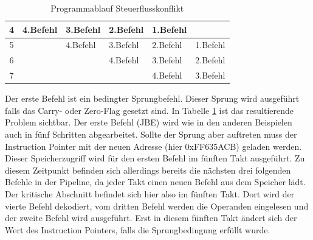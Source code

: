 \documentclass[12pt]{article}
\begin{document}
\begin{table}[]
\begin{tabular}{|c|l|l|l|l|l|}
4             & \cellcolor[HTML]{FFFE65}4.Befehl                                                        & \cellcolor[HTML]{67FD9A}3.Befehl                                                           & \cellcolor[HTML]{38FFF8}2.Befehl                                                            & \cellcolor[HTML]{9698ED}1.Befehl        &                                                                                               \\ \hline
5             & \cellcolor[HTML]{FFFFFF}                                                                & \cellcolor[HTML]{FFFE65}4.Befehl                                                           & \cellcolor[HTML]{67FD9A}3.Befehl                                                            & \cellcolor[HTML]{38FFF8}2.Befehl        & \cellcolor[HTML]{9698ED}1.Befehl                                                              \\ \hline
6             &                                                                                         & \cellcolor[HTML]{FFFFFF}                                                                   & \cellcolor[HTML]{FFFE65}4.Befehl                                                            & \cellcolor[HTML]{67FD9A}3.Befehl        & \cellcolor[HTML]{38FFF8}2.Befehl                                                              \\ \hline
7             &                                                                                         &                                                                                            & \cellcolor[HTML]{FFFFFF}                                                                    & \cellcolor[HTML]{FFFE65}4.Befehl        & \cellcolor[HTML]{67FD9A}3.Befehl                                                              \\ \hline
\end{tabular}
\caption{Programmablauf Steuerflusskonflikt}
\label{tab:Steuerflusskonflikt}

\end{table}

\noindent Der erste Befehl ist ein bedingter Sprungbefehl. Dieser Sprung wird ausgeführt falls das Carry- oder Zero-Flag gesetzt sind. In Tabelle \ref{tab:Steuerflusskonflikt} ist das resultierende Problem sichtbar. Der erste Befehl (JBE) wird wie in den anderen Beispielen auch in fünf Schritten abgearbeitet. Sollte der Sprung aber auftreten muss der Instruction Pointer mit der neuen Adresse (hier 0xFF635ACB) geladen werden. Dieser Speicherzugriff wird für den ersten Befehl im fünften Takt ausgeführt. Zu diesem Zeitpunkt befinden sich allerdings bereits die nächsten drei folgenden Befehle in der Pipeline, da jeder Takt einen neuen Befehl aus dem Speicher lädt. Der kritische Abschnitt befindet sich hier also im fünften Takt. Dort wird der vierte Befehl dekodiert, vom dritten Befehl werden die Operanden eingelesen und der zweite Befehl wird ausgeführt. Erst in diesem fünften Takt ändert sich der Wert des Instruction Pointers, falls die Sprungbedingung erfüllt wurde. 
\end{document}
